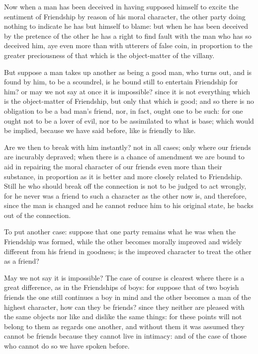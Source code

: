 Now when a man has been deceived in having supposed himself to excite the
sentiment of Friendship by reason of his moral character, the other party doing
nothing to indicate he has but himself to blame: but when he has been deceived
by the pretence of the other he has a right to find fault with the man who has
so deceived him, aye even more than with utterers of false coin, in proportion
to the greater preciousness of that which is the object-matter of the villany.

But suppose a man takes up another as being a good man, who turns out, and is
found by him, to be a scoundrel, is he bound still to entertain Friendship for
him? or may we not say at once it is impossible? since it is not everything
which is the object-matter of Friendship, but only that which is good; and so
there is no obligation to be a bad man’s friend, nor, in fact, ought one
to be such: for one ought not to be a lover of evil, nor to be assimilated to
what is base; which would be implied, because we have said before, like is
friendly to like.

Are we then to break with him instantly? not in all cases; only where our
friends are incurably depraved; when there is a chance of amendment we are
bound to aid in repairing the moral character of our friends even more than
their substance, in proportion as it is better and more closely related to
Friendship. Still he who should break off the connection is not to be judged to
act wrongly, for he never was a friend to such a character as the other now is,
and therefore, since the man is changed and he cannot reduce him to his
original state, he backs out of the connection.

To put another case: suppose that one party remains what he was when the
Friendship was formed, while the other becomes morally improved and widely
different from his friend in goodness; is the improved character to treat the
other as a friend?

May we not say it is impossible? The case of course is clearest where there is
a great difference, as in the Friendships of boys: for suppose that of two
boyish friends the one still continues a boy in mind and the other becomes a
man of the highest character, how can they be friends? since they neither are
pleased with the same objects nor like and dislike the same things: for these
points will not belong to them as regards one another, and without them it was
assumed they cannot be friends because they cannot live in intimacy: and of the
case of those who cannot do so we have spoken before.

